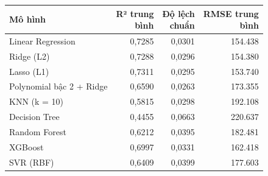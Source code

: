 \begin{tabular}{lrrr}
\toprule
Mô hình & \makecell[r]{R² trung\\bình} & \makecell[r]{Độ lệch\\chuẩn} & \makecell[r]{RMSE trung\\bình} \\
\midrule
Linear Regression & 0{,}7285 & 0{,}0301 & 154{.}438 \\
Ridge (L2) & 0{,}7288 & 0{,}0296 & 154{.}380 \\
Lasso (L1) & 0{,}7311 & 0{,}0295 & 153{.}740 \\
Polynomial bậc 2 + Ridge & 0{,}6590 & 0{,}0263 & 173{.}355 \\
KNN (k = 10) & 0{,}5815 & 0{,}0298 & 192{.}108 \\
Decision Tree & 0{,}4455 & 0{,}0663 & 220{.}637 \\
Random Forest & 0{,}6212 & 0{,}0395 & 182{.}481 \\
XGBoost & 0{,}6997 & 0{,}0331 & 162{.}418 \\
SVR (RBF) & 0{,}6409 & 0{,}0399 & 177{.}603 \\
\bottomrule
\end{tabular}
